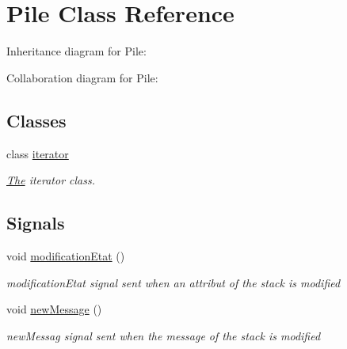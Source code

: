 \hypertarget{class_pile}{}\section{Pile Class Reference}
\label{class_pile}


Inheritance diagram for Pile\+:


Collaboration diagram for Pile\+:
\subsection*{Classes}
\begin{DoxyCompactItemize}
\item 
class \hyperlink{class_pile_1_1iterator}{iterator}
\begin{DoxyCompactList}\small\item\em \hyperlink{class_the}{The} iterator class. \end{DoxyCompactList}\end{DoxyCompactItemize}
\subsection*{Signals}
\begin{DoxyCompactItemize}
\item 
void \hyperlink{class_pile_ac55a0afb626baffd1019567cbaa7f4b2}{modification\+Etat} ()\hypertarget{class_pile_ac55a0afb626baffd1019567cbaa7f4b2}{}\label{class_pile_ac55a0afb626baffd1019567cbaa7f4b2}

\begin{DoxyCompactList}\small\item\em modification\+Etat signal sent when an attribut of the stack is modified \end{DoxyCompactList}\item 
void \hyperlink{class_pile_a9ee28bbf0994bc8f75873b567ba98834}{new\+Message} ()\hypertarget{class_pile_a9ee28bbf0994bc8f75873b567ba98834}{}\label{class_pile_a9ee28bbf0994bc8f75873b567ba98834}

\begin{DoxyCompactList}\small\item\em new\+Messag signal sent when the message of the stack is modified \end{DoxyCompactList}\end{DoxyCompactItemize}
